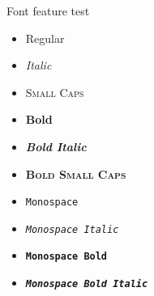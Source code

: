 \documentclass[10pt]{ctexbeamer}
\begin{document}
\begin{frame}{Font feature test}
  \begin{itemize}
    \item Regular
    \item \textit{Italic}
    \item \textsc{Small Caps}
    \item \textbf{Bold}
    \item \textbf{\textit{Bold Italic}}
    \item \textbf{\textsc{Bold Small Caps}}
    \item \texttt{Monospace}
    \item \texttt{\textit{Monospace Italic}}
    \item \texttt{\textbf{Monospace Bold}}
    \item \texttt{\textbf{\textit{Monospace Bold Italic}}}
  \end{itemize}
\end{frame}
\end{document}
